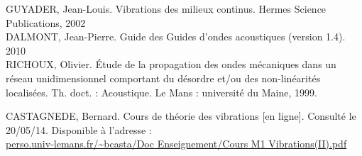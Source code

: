 \documentclass[a4paper,11pt]{report} %
\begin{document}
\indent[GUY] GUYADER, Jean-Louis. Vibrations des milieux continus. Hermes Science Publications, 2002 \\
\indent[DAL] DALMONT, Jean-Pierre. Guide des Guides d'ondes acoustiques (version 1.4). 2010 \\ 
\indent[RIC] RICHOUX, Olivier. Étude de la propagation des ondes mécaniques dans un réseau unidimensionnel comportant du désordre et/ou des non-linéarités localisées. Th. doct. : Acoustique. Le Mans : université du Maine, 1999.




\indent[CAS] CASTAGNEDE, Bernard. Cours de théorie des vibrations [en ligne]. Consulté le 20/05/14. Disponible à l'adresse : \\ \url{perso.univ-lemans.fr/~bcasta/Doc Enseignement/Cours M1 Vibrations(II).pdf}
\end{document}
